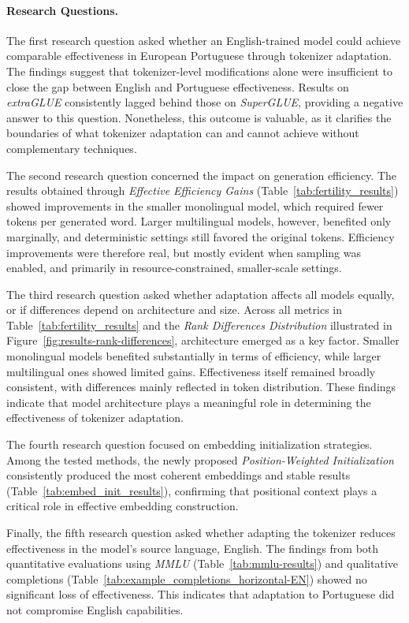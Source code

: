 \paragraph{\textbf{Research Questions.}}
The first research question asked whether an English-trained model could achieve comparable effectiveness in European Portuguese through tokenizer adaptation.
The findings suggest that tokenizer-level modifications alone were insufficient to close the gap between English and Portuguese effectiveness.
Results on \textit{extraGLUE} consistently lagged behind those on \textit{SuperGLUE}, providing a negative answer to this question. Nonetheless, this outcome is valuable, as it clarifies the boundaries of what tokenizer adaptation can and cannot achieve without complementary techniques.  

The second research question concerned the impact on generation efficiency. The results obtained through \textit{Effective Efficiency Gains} (Table~\ref{tab:fertility_results}) showed improvements in the smaller monolingual model, which required fewer tokens per generated word. Larger multilingual models, however, benefited only marginally, and deterministic settings still favored the original tokens. Efficiency improvements were therefore real, but mostly evident when sampling was enabled, and primarily in resource-constrained, smaller-scale settings.

The third research question asked whether adaptation affects all models equally, or if differences depend on architecture and size.
Across all metrics in Table~\ref{tab:fertility_results} and the \textit{Rank Differences Distribution} illustrated in Figure~\ref{fig:results-rank-differences}, architecture emerged as a key factor. Smaller monolingual models benefited substantially in terms of efficiency, while larger multilingual ones showed limited gains. Effectiveness itself remained broadly consistent, with differences mainly reflected in token distribution. These findings indicate that model architecture plays a meaningful role in determining the effectiveness of tokenizer adaptation.

The fourth research question focused on embedding initialization strategies. Among the tested methods, the newly proposed \textit{Position-Weighted Initialization} consistently produced the most coherent embeddings and stable results (Table~\ref{tab:embed_init_results}), confirming that positional context plays a critical role in effective embedding construction.

Finally, the fifth research question asked whether adapting the tokenizer reduces effectiveness in the model's source language, English. The findings from both quantitative evaluations using \textit{MMLU} (Table~\ref{tab:mmlu-results}) and qualitative completions (Table~\ref{tab:example_completions_horizontal-EN}) showed no significant loss of effectiveness. This indicates that adaptation to Portuguese did not compromise English capabilities.

